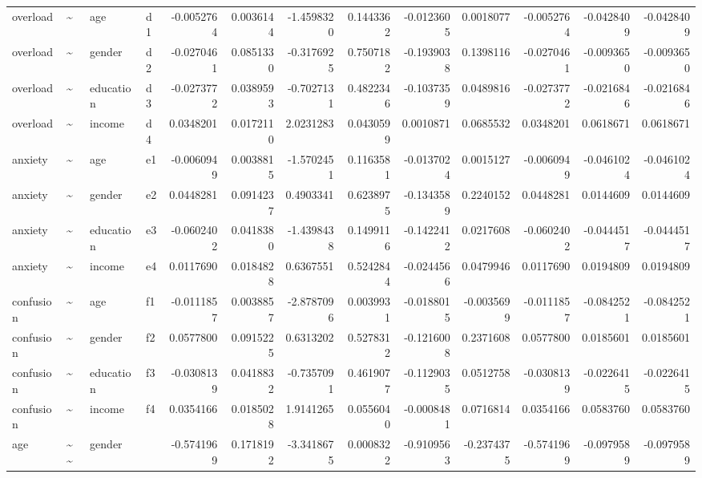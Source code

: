 \documentclass[
]{article}
\begin{document}
\begin{table}[!h]
\begin{tabular}[t]{llllrrrrrrrrr}
overload & \textasciitilde{} & age & d1 & -0.0052764 & 0.0036144 & -1.4598320 & 0.1443362 & -0.0123605 & 0.0018077 & -0.0052764 & -0.0428409 & -0.0428409\\
overload & \textasciitilde{} & gender & d2 & -0.0270461 & 0.0851330 & -0.3176925 & 0.7507182 & -0.1939038 & 0.1398116 & -0.0270461 & -0.0093650 & -0.0093650\\
overload & \textasciitilde{} & education & d3 & -0.0273772 & 0.0389593 & -0.7027131 & 0.4822346 & -0.1037359 & 0.0489816 & -0.0273772 & -0.0216846 & -0.0216846\\
\addlinespace
overload & \textasciitilde{} & income & d4 & 0.0348201 & 0.0172110 & 2.0231283 & 0.0430599 & 0.0010871 & 0.0685532 & 0.0348201 & 0.0618671 & 0.0618671\\
anxiety & \textasciitilde{} & age & e1 & -0.0060949 & 0.0038815 & -1.5702451 & 0.1163581 & -0.0137024 & 0.0015127 & -0.0060949 & -0.0461024 & -0.0461024\\
anxiety & \textasciitilde{} & gender & e2 & 0.0448281 & 0.0914237 & 0.4903341 & 0.6238975 & -0.1343589 & 0.2240152 & 0.0448281 & 0.0144609 & 0.0144609\\
anxiety & \textasciitilde{} & education & e3 & -0.0602402 & 0.0418380 & -1.4398438 & 0.1499116 & -0.1422412 & 0.0217608 & -0.0602402 & -0.0444517 & -0.0444517\\
anxiety & \textasciitilde{} & income & e4 & 0.0117690 & 0.0184828 & 0.6367551 & 0.5242844 & -0.0244566 & 0.0479946 & 0.0117690 & 0.0194809 & 0.0194809\\
\addlinespace
confusion & \textasciitilde{} & age & f1 & -0.0111857 & 0.0038857 & -2.8787096 & 0.0039931 & -0.0188015 & -0.0035699 & -0.0111857 & -0.0842521 & -0.0842521\\
confusion & \textasciitilde{} & gender & f2 & 0.0577800 & 0.0915225 & 0.6313202 & 0.5278312 & -0.1216008 & 0.2371608 & 0.0577800 & 0.0185601 & 0.0185601\\
confusion & \textasciitilde{} & education & f3 & -0.0308139 & 0.0418832 & -0.7357091 & 0.4619077 & -0.1129035 & 0.0512758 & -0.0308139 & -0.0226415 & -0.0226415\\
confusion & \textasciitilde{} & income & f4 & 0.0354166 & 0.0185028 & 1.9141265 & 0.0556040 & -0.0008481 & 0.0716814 & 0.0354166 & 0.0583760 & 0.0583760\\
age & \textasciitilde{}\textasciitilde{} & gender &  & -0.5741969 & 0.1718192 & -3.3418675 & 0.0008322 & -0.9109563 & -0.2374375 & -0.5741969 & -0.0979589 & -0.0979589\\

\end{tabular}
\end{table}
\end{document}
